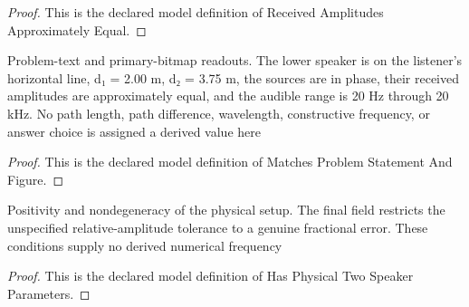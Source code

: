 \begin{proof}
  This is the declared model definition of Received Amplitudes Approximately Equal.
\end{proof}
\begin{definition}
  \label{def:physics:phyx-mini-0314:phyxminiproblems-problemphyxmini0314-matchesproblemstatementandfigure}
  Problem-text and primary-bitmap readouts. The lower speaker is on the listener's horizontal line, d₁ = 2.00 m, d₂ = 3.75 m, the sources are in phase, their received amplitudes are approximately equal, and the audible range is 20 Hz through 20 kHz. No path length, path difference, wavelength, constructive frequency, or answer choice is assigned a derived value here
\end{definition}
\begin{proof}
  This is the declared model definition of Matches Problem Statement And Figure.
\end{proof}
\begin{definition}
  \label{def:physics:phyx-mini-0314:phyxminiproblems-problemphyxmini0314-hasphysicaltwospeakerparameters}
  Positivity and nondegeneracy of the physical setup. The final field restricts the unspecified relative-amplitude tolerance to a genuine fractional error. These conditions supply no derived numerical frequency
\end{definition}
\begin{proof}
  This is the declared model definition of Has Physical Two Speaker Parameters.
\end{proof}
